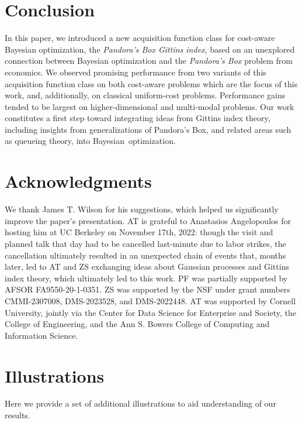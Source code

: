 \documentclass{article}
\begin{document}
\section{Conclusion}

In this paper, we introduced a new acquisition function class for cost-aware Bayesian optimization, the \emph{Pandora's Box Gittins index}, based on an unexplored connection between Bayesian optimization and the \emph{Pandora's Box} problem from economics. 
We observed promising performance from two variants of this acquisition function class on both cost-aware problems which are the focus of this work, and, additionally, on classical uniform-cost problems.
Performance gains tended to be largest on higher-dimensional and multi-modal problems.
Our work constitutes a first step toward integrating ideas from Gittins index theory, including insights from generalizations of Pandora's Box, and related areas such as queueing theory, into Bayesian~optimization.

\section*{Acknowledgments}

We thank James T. Wilson for his suggestions, which helped us significantly improve the paper's presentation.
AT is grateful to Anastasios Angelopoulos for hosting him at UC Berkeley on November 17th, 2022: though the visit and planned talk that day had to be cancelled last-minute due to labor strikes, the cancellation ultimately resulted in an unexpected chain of events that, months later, led to AT and ZS exchanging ideas about Gaussian processes and Gittins index theory, which ultimately led to this work.
PF was partially supported by AFSOR FA9550-20-1-0351.
ZS was supported by the NSF under grant numbers CMMI-2307008, DMS-2023528, and DMS-2022448.
AT was supported by Cornell University, jointly via the Center for Data Science for Enterprise and Society, the College of Engineering, and the Ann S. Bowers College of Computing and Information Science.

\printbibliography

\clearpage

\appendix

\section{Illustrations}
\label{apdx:visual}

Here we provide a set of additional illustrations to aid understanding of our results.
\end{document}
